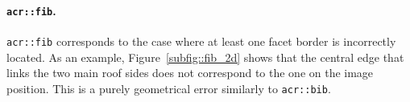             \paragraph{\texttt{\acrlong*{acr::fib}}.}
                \texttt{\gls{acr::fib}} corresponds to the case where at least one facet border is incorrectly located.
                As an example, Figure~\ref{subfig::fib_2d} shows that the central edge that links the two main roof sides does not correspond to the one on the image position.
                This is a purely geometrical error similarly to \texttt{\gls{acr::bib}}.\\

                \begin{figure}[htbp]
                    \centering
\end{figure}
